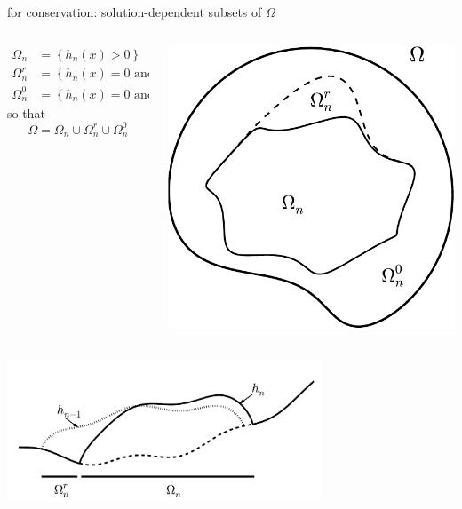 \documentclass[hide notes,intlimits]{beamer}
\begin{document}
\begin{frame}{for conservation: solution-dependent subsets of $\Omega$}

\vspace{3mm}
\begin{columns}
\begin{column}{0.65\textwidth}
\begin{align*}
\Omega_n &= \left\{h_n(x)>0\right\} \\
\Omega_n^r &= \left\{h_n(x)=0 \text{ and } h_{n-1}(x) > 0\right\} \\
\Omega_n^0 &= \left\{h_n(x)=0 \text{ and } h_{n-1}(x) = 0\right\}
\end{align*}
so that
   $$\Omega = \Omega_n \cup \Omega_n^r \cup \Omega_n^0$$
\end{column}
\begin{column}{0.35\textwidth}
\includegraphics[width=1.0\textwidth,keepaspectratio=true]{domains-fig}
\end{column}
\end{columns}

\begin{center}
\includegraphics[width=0.7\textwidth,keepaspectratio=true]{cartoon-sets}
\end{center}
\end{frame}
\end{document}
